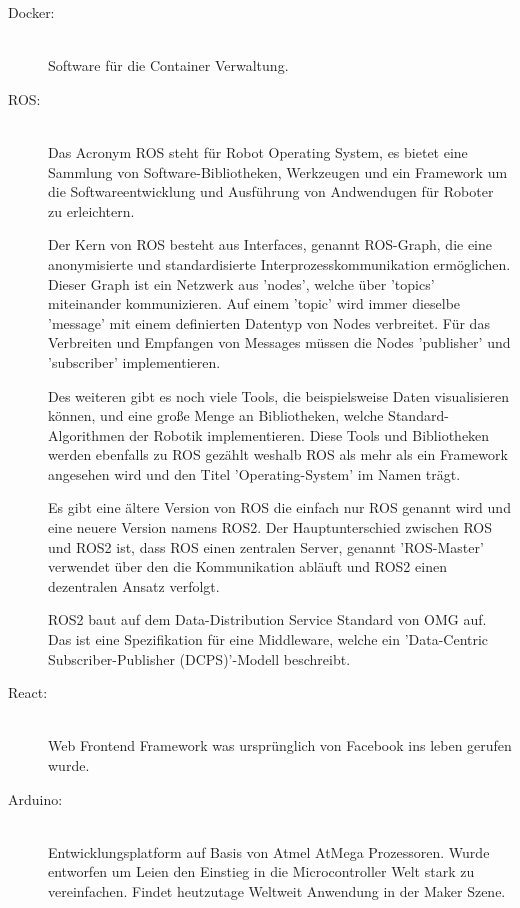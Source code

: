 \begin{flushleft}
    \begin{description}
        \item[Docker:]\hfill\\
        Software für die Container Verwaltung.

        \item[ROS:]\hfill\\
        Das Acronym ROS steht für Robot Operating System, es bietet eine Sammlung von Software-Bibliotheken, Werkzeugen und ein Framework um die Softwareentwicklung und Ausführung von Andwendugen für Roboter zu erleichtern.

        Der Kern von ROS besteht aus Interfaces, genannt ROS-Graph, die eine anonymisierte und standardisierte Interprozesskommunikation ermöglichen.
        Dieser Graph ist ein Netzwerk aus 'nodes', welche über 'topics' miteinander kommunizieren.
        Auf einem 'topic' wird immer dieselbe 'message' mit einem definierten Datentyp von Nodes verbreitet. 
        Für das Verbreiten und Empfangen von Messages müssen die Nodes 'publisher' und 'subscriber' implementieren.

        Des weiteren gibt es noch viele Tools, die beispielsweise Daten visualisieren können, und eine große Menge an Bibliotheken, welche Standard-Algorithmen der Robotik implementieren.
        Diese Tools und Bibliotheken werden ebenfalls zu ROS gezählt weshalb ROS als mehr als ein Framework angesehen wird und den Titel 'Operating-System' im Namen trägt.

        Es gibt eine ältere Version von ROS die einfach nur ROS genannt wird und eine neuere Version namens ROS2.
        Der Hauptunterschied zwischen ROS und ROS2 ist, dass ROS einen zentralen Server, genannt 'ROS-Master' verwendet über den die Kommunikation abläuft und ROS2 einen dezentralen Ansatz verfolgt.
        
        ROS2 baut auf dem Data-Distribution Service Standard von OMG auf. 
        Das ist eine Spezifikation für eine Middleware, welche ein 'Data-Centric Subscriber-Publisher (DCPS)'-Modell beschreibt.


        \item[React:]\hfill\\
        Web Frontend Framework was ursprünglich von Facebook ins leben gerufen wurde.

        \item[Arduino:]\hfill\\
        Entwicklungsplatform auf Basis von Atmel AtMega Prozessoren. Wurde entworfen um Leien den Einstieg in die Microcontroller
        Welt stark zu vereinfachen. Findet heutzutage Weltweit Anwendung in der Maker Szene.


\end{description}
\end{flushleft}
